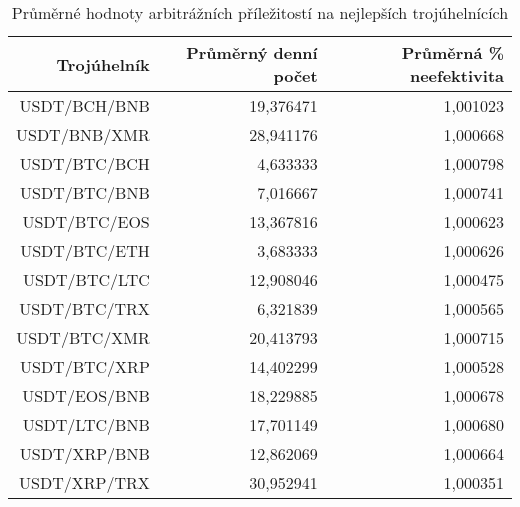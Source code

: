 \begin{table}\centering
\caption{Průměrné hodnoty arbitrážních příležitostí na nejlepších trojúhelnících}
\label{table_averages_best}
\begin{tabular}{|| r | r | r ||}\hline Trojúhelník & Průměrný denní počet & Průměrná \% neefektivita\\
 \hline\hline USDT/BCH/BNB & 19,376471 & 1,001023\\ 
 \hline USDT/BNB/XMR & 28,941176 & 1,000668\\ 
 \hline USDT/BTC/BCH & 4,633333 & 1,000798\\ 
 \hline USDT/BTC/BNB & 7,016667 & 1,000741\\ 
 \hline USDT/BTC/EOS & 13,367816 & 1,000623\\ 
 \hline USDT/BTC/ETH & 3,683333 & 1,000626\\ 
 \hline USDT/BTC/LTC & 12,908046 & 1,000475\\ 
 \hline USDT/BTC/TRX & 6,321839 & 1,000565\\ 
 \hline USDT/BTC/XMR & 20,413793 & 1,000715\\ 
 \hline USDT/BTC/XRP & 14,402299 & 1,000528\\ 
 \hline USDT/EOS/BNB & 18,229885 & 1,000678\\ 
 \hline USDT/LTC/BNB & 17,701149 & 1,000680\\ 
 \hline USDT/XRP/BNB & 12,862069 & 1,000664\\ 
 \hline USDT/XRP/TRX & 30,952941 & 1,000351\\ 
 \hline
\end{tabular}
\end{table}